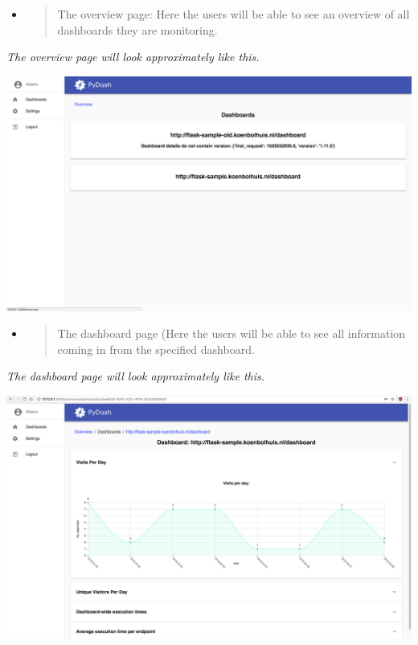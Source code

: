 \begin{itemize}
\item
  \begin{quote}
  The overview page: Here the users will be able to see an overview of
  all dashboards they are monitoring.
  \end{quote}
\end{itemize}

\emph{The overview page will look approximately like
this.}

\includegraphics[width=\pagewidth]{media/image33.png}

\begin{itemize}
\item
  \begin{quote}
  The dashboard page (Here the users will be able to see all
  information coming in from the specified dashboard.
  \end{quote}
\end{itemize}

\emph{The dashboard page will look approximately like
this.}

\includegraphics[width=\pagewidth]{media/image27.png}

